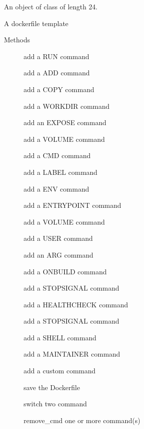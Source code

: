 \documentclass[a4paper]{book}
\begin{document}
%
\begin{Format}
An object of class  of length 24.
\end{Format}
%
\begin{Value}
A dockerfile template
\end{Value}
%
\begin{Section}{Methods}

\begin{description}

\item[] add a RUN command
\item[] add a ADD command
\item[] add a COPY command
\item[] add a WORKDIR command
\item[] add an EXPOSE command
\item[] add a VOLUME command
\item[] add a CMD command
\item[] add a LABEL command
\item[] add a ENV command
\item[] add a ENTRYPOINT command
\item[] add a VOLUME command
\item[] add a USER command
\item[] add an ARG command
\item[] add a ONBUILD command
\item[] add a STOPSIGNAL command
\item[] add a HEALTHCHECK command
\item[] add a STOPSIGNAL command
\item[] add a SHELL command
\item[] add a MAINTAINER command
\item[] add a custom command
\item[] save the Dockerfile
\item[] switch two command
\item[] remove\_cmd one or more command(s)

\end{description}

\end{Section}
\end{document}
